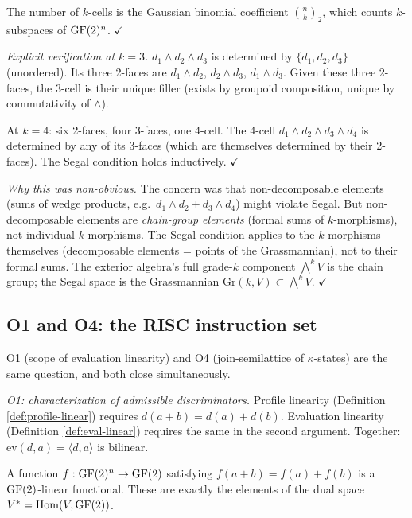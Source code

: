 The number of $k$-cells is the Gaussian binomial
coefficient $\binom{n}{k}_2$, which counts
$k$-subspaces of $\operatorname{GF}(2)^n$. $\checkmark$

\emph{Explicit verification at $k = 3$.}
$d_1 \wedge d_2 \wedge d_3$ is determined by
$\{d_1, d_2, d_3\}$ (unordered). Its three 2-faces
are $d_1 \wedge d_2$, $d_2 \wedge d_3$,
$d_1 \wedge d_3$. Given these three 2-faces, the
3-cell is their unique filler (exists by groupoid
composition, unique by commutativity of $\wedge$).

At $k = 4$: six 2-faces, four 3-faces, one 4-cell.
The 4-cell $d_1 \wedge d_2 \wedge d_3 \wedge d_4$ is
determined by any of its 3-faces (which are themselves
determined by their 2-faces). The Segal condition
holds inductively. $\checkmark$

\emph{Why this was non-obvious.}
The concern was that non-decomposable elements (sums
of wedge products, e.g.\ $d_1 \wedge d_2 + d_3 \wedge
d_4$) might violate Segal. But non-decomposable
elements are \emph{chain-group elements} (formal sums
of $k$-morphisms), not individual $k$-morphisms. The
Segal condition applies to the $k$-morphisms themselves
(decomposable elements = points of the Grassmannian),
not to their formal sums. The exterior algebra's full
grade-$k$ component $\bigwedge^k V$ is the chain group;
the Segal space is the Grassmannian
$\mathrm{Gr}(k, V) \subset \bigwedge^k V$. $\checkmark$


\subsection{O1 and O4: the RISC instruction set}
\label{app:risc}

O1 (scope of evaluation linearity) and O4
(join-semilattice of $\kappa$-states) are the same
question, and both close simultaneously.

\emph{O1: characterization of admissible discriminators.}
Profile linearity (Definition \ref{def:profile-linear})
requires $d(a + b) = d(a) + d(b)$. Evaluation linearity
(Definition \ref{def:eval-linear}) requires the same in
the second argument. Together: $\mathrm{ev}(d, a) =
\langle d, a \rangle$ is bilinear.

A function $f: \operatorname{GF}(2)^n \to \operatorname{GF}(2)$ satisfying
$f(a + b) = f(a) + f(b)$ is a $\operatorname{GF}(2)$-linear
functional. These are exactly the elements of the dual
space $V^* = \operatorname{Hom}(V, \operatorname{GF}(2))$.

